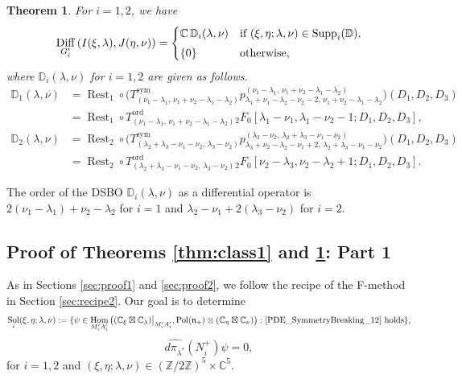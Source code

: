 \documentclass[a4paper,11pt,reqno]{amsart}
\newcommand{\frakn}{\mathfrak{n}}
\newcommand{\CC}{\mathbb{C}}
\newcommand{\DD}{\mathbb{D}}
\newcommand{\ZZ}{\mathbb{Z}}
\newcommand{\0}{{\bf 0}}
\newcommand{\1}{{\bf 1}}
\DeclareMathOperator{\Hom}{Hom}
\DeclareMathOperator{\Pol}{Pol}
\newcommand{\ord}{{\mathrm{ord}}}
\DeclareMathOperator{\Supp}{Supp}
\DeclareMathOperator{\Diff}{Diff}
\DeclareMathOperator{\Sol}{Sol}
\DeclareMathOperator{\Rest}{Rest}
\theoremstyle{plain}
\newtheorem{theorem}[equation]{Theorem}
\theoremstyle{definition}
\numberwithin{equation}{section}
\theoremstyle{definition}
\begin{document}
\begin{theorem}\label{thm:cons1}
For $i=1,2$, we have
\begin{equation*}
\Diff_{G_i^\prime}\left(I(\xi, \lambda), J(\eta, \nu)\right)
=
\begin{cases}
\CC\, \DD_i(\lambda, \nu) & 
\textnormal{if $(\xi, \eta; \lambda, \nu) \in \Supp_i(\DD)$},\\[3pt]
\{0\} & \textnormal{otherwise},
\end{cases}
\end{equation*}
where $\DD_i(\lambda, \nu)$ for $i=1,2$ are given as follows.
\vspace{5pt}
\begin{align*}
\DD_1(\lambda,\nu)
&=\Rest_1\circ
\big(T^{\mathrm{sym}}_{(\nu_1-\lambda_1,\,\nu_1+\nu_2-\lambda_1-\lambda_2)}
p_{\lambda_1+\nu_1-\lambda_2-\nu_2-2,\,\nu_1+\nu_2-\lambda_1-\lambda_2}^{(\nu_1-\lambda_1,\,\nu_1+\nu_2-\lambda_1-\lambda_2)}\big)(D_1,D_2,D_3)\\[5pt]
&=\Rest_1\circ 
T^\ord_{(\nu_1-\lambda_1,\,\nu_1+\nu_2-\lambda_1-\lambda_2)}{}_2F_0
[\lambda_1-\nu_1, \lambda_1-\nu_2-1;  D_1, D_2, D_3],\\[10pt]
\DD_2(\lambda,\nu)
&=\Rest_2\circ 
\big(T^{\mathrm{sym}}_{(\lambda_2+\lambda_3-\nu_1-\nu_2,\,\lambda_3-\nu_2)}
p_{\lambda_3+\nu_2-\lambda_2-\nu_1+2,\,\lambda_2+\lambda_3-\nu_1-\nu_2}^{(\lambda_3-\nu_2,\, \lambda_2+\lambda_3-\nu_1-\nu_2)}\big)(D_1,D_2,D_3) \\[5pt]
&=\Rest_2\circ  
T^\ord_{(\lambda_2+\lambda_3-\nu_1-\nu_2,\,\lambda_3-\nu_2)}
{}_2F_0[\nu_2-\lambda_3, \nu_2-\lambda_2+1;D_1, D_2, D_3].
\end{align*}
\end{theorem}

The order of the DSBO $\DD_i(\lambda,\nu)$
as a differential operator is
$2(\nu_1-\lambda_1) + \nu_2 - \lambda_2$ for $i=1$
and
$\lambda_2 - \nu_1 + 2(\lambda_3 - \nu_2)$ for $i=2$.

\subsection{Proof of  Theorems \texorpdfstring{\ref{thm:class1}}{9.7} and \texorpdfstring{\ref{thm:cons1}}{9.9}: Part 1} 
\label{sec:Thms12A}

As in Sections \ref{sec:proof1} and \ref{sec:proof2}, we follow the recipe of the F-method
in Section \ref{sec:recipe2}. Our goal is to determine
\begin{align*}
\Sol_i(\xi,\eta; \lambda,\nu) := \{ \psi \in \Hom_{M_i'A_i'}\big((\CC_\xi\boxtimes \CC_{\lambda})\big\rvert_{M_i'A_i'},\Pol(\frakn_+)\otimes (\CC_\eta\boxtimes \CC_{\nu})\big) : \eqref{PDE_SymmetryBreaking_12} \text{ holds}\},
\end{align*}
\begin{equation}\label{PDE_SymmetryBreaking_12}
\widehat{d\pi_{\lambda^*}}(N_{i}^+)\psi = 0,
\end{equation}
for $i=1,2$ and $(\xi,\eta; \lambda,\nu) \in (\ZZ/2\ZZ)^5\times \CC^5$.
\end{document}
